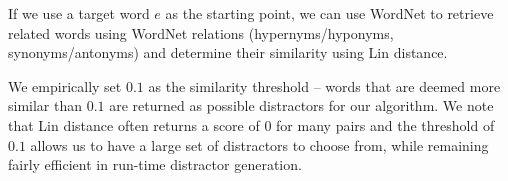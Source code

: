 If we use a target word $e$ as the starting point, we can use WordNet
to retrieve related words using WordNet relations (hypernyms/hyponyms,
synonyms/antonyms) and determine their similarity using Lin distance.

We empirically set $0.1$ as the similarity threshold -- words that are
deemed more similar than $0.1$ are returned as possible distractors
for our algorithm.  We note that Lin distance often returns a score of
0 for many pairs and the threshold of $0.1$ allows us to have a large
set of distractors to choose from, while remaining fairly efficient in
run-time distractor generation.


%
%
%


